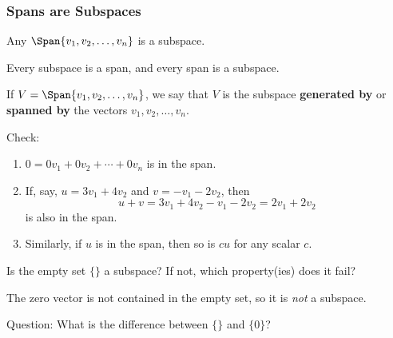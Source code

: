 
\begin{frame}
\frametitle{Spans are Subspaces}

\vskip-3mm
\begin{thm}
  Any $\Span\{v_1,v_2,\ldots,v_n\}$ is a subspace.
\end{thm}

\pause\medskip
\begin{bluebox}[!!!]{.7\linewidth}
  Every subspace is a span, and every span is a subspace.
\end{bluebox}

\pause
\begin{defn}
  If $V = \Span\{v_1,v_2,\ldots,v_n\}$, we say that $V$ is the
  subspace \textbf{generated by} or \textbf{spanned by}
  the vectors $v_1,v_2,\ldots,v_n$.
\end{defn}

\medskip
\begin{webonly}
\alert{Check:}
\begin{enumerate}
\item $0 = 0v_1 + 0v_2 + \cdots + 0v_n$ is in the span.
\item If, say, $u = 3v_1 + 4v_2$ and $v = -v_1 - 2v_2$, then
  \[ u + v = 3v_1 + 4v_2 -v_1 - 2v_2 = 2v_1 + 2v_2 \]
  is also in the span.
\item Similarly, if $u$ is in the span, then so is $cu$ for any scalar $c$.
\end{enumerate}
\end{webonly}

\end{frame}



\begin{pollframe}

\begin{poll}
\vfill

\begin{bluebox}[Poll]{.9\linewidth}
  Is the empty set $\{\}$ a subspace?  If not, which property(ies) does it fail?
\end{bluebox}

\pause\medskip
The zero vector is not contained in the empty set, so it is \emph{not} a
subspace.
\end{poll}

\pause\bigskip
\alert{Question:} What is the difference between $\{\}$ and $\{0\}$?

\vfill

\end{pollframe}


